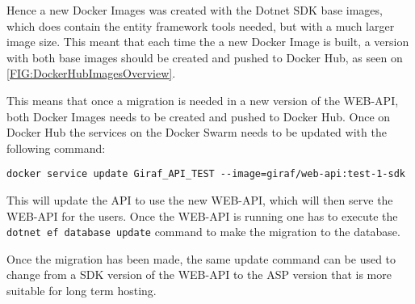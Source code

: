 Hence a new Docker Images was created with the Dotnet SDK base images, which does contain the entity framework tools needed, but with a much larger image size. 
This meant that each time the a new Docker Image is built, a version with both base images should be created and pushed to Docker Hub, as seen on \autoref{FIG:DockerHubImagesOverview}. 


This means that once a migration is needed in a new version of the WEB-API, both Docker Images needs to be created and pushed to Docker Hub. 
Once on Docker Hub the services on the Docker Swarm needs to be updated with the following command:

\lstinline$docker service update Giraf_API_TEST --image=giraf/web-api:test-1-sdk$

This will update the API to use the new WEB-API, which will then serve the WEB-API for the users.
Once the WEB-API is running one has to execute the \lstinline$dotnet ef database update$ command to make the migration to the database.

Once the migration has been made, the same update command can be used to change from a SDK version of the WEB-API to the ASP version that is more suitable for long term hosting.




